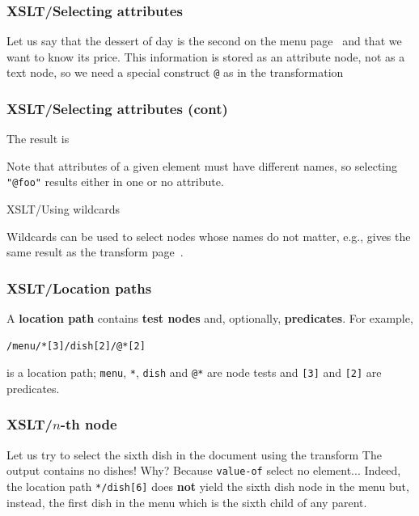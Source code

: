 %
\begin{frame}[containsverbatim]
\frametitle{XSLT/Selecting attributes}
\label{index}

Let us say that the dessert of day is the second on the menu
page~\pageref{menu} and that we want to know its price. This
information is stored as an attribute node, not as a text node, so we
need a special construct \verb|@| as in the transformation

\end{frame}

%
\begin{frame}[containsverbatim]
\frametitle{XSLT/Selecting attributes (cont)}

The result is

\bigskip

Note that attributes of a given element must have different names, so
selecting \verb|"@foo"| results either in one or no attribute.

\end{frame}

%
\begin{frame}{XSLT/Using wildcards}

Wildcards can be used to select nodes whose names do not matter, e.g.,
 gives the same result as the transform
page~\pageref{index}.

\end{frame}

%
\begin{frame}[containsverbatim]
\frametitle{XSLT/Location paths}

A \textbf{location path} contains \textbf{test nodes} and, optionally,
\textbf{predicates}. For example,
\begin{verbatim}
/menu/*[3]/dish[2]/@*[2]
\end{verbatim}
is a location path; \verb|menu|, \verb|*|, \verb|dish| and \verb|@*|
are node tests and \verb|[3]| and \verb|[2]| are predicates.

\end{frame}

%
\begin{frame}[containsverbatim]
\frametitle{XSLT/\(n\)-th node}

Let us try to select the sixth dish in the document using
the transform 
The output contains no dishes! Why? Because \texttt{value-of}
select no element... Indeed, the location path \verb|*/dish[6]| does
\textbf{not} yield the sixth dish node in the menu but, instead, the
first dish in the menu which is the sixth child of any parent.

\end{frame}

